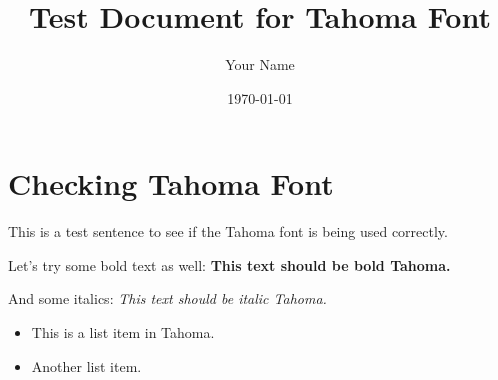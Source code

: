 \documentclass{report}
\title{Test Document for Tahoma Font}
\author{Your Name}
\date{\today}
\begin{document}
\maketitle

\section{Checking Tahoma Font}

This is a test sentence to see if the Tahoma font is being used correctly.

Let's try some bold text as well: \textbf{This text should be bold Tahoma.}

And some italics: \textit{This text should be italic Tahoma.}

\begin{itemize}
    \item This is a list item in Tahoma.
    \item Another list item.
\end{itemize}
\end{document}
